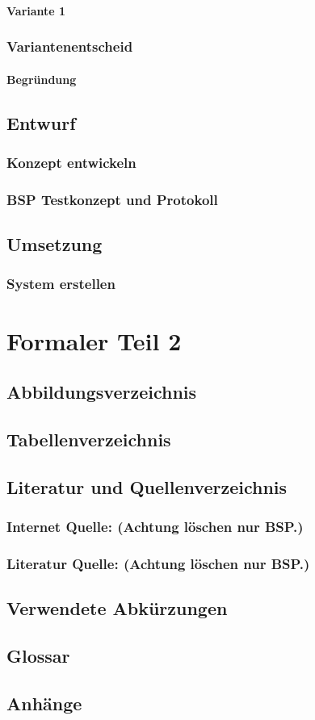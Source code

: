 \documentclass{report}
\begin{document}
\subsection{Variante 1}
\section{Variantenentscheid}
\subsection{Begründung}

\chapter{Entwurf}
\section{Konzept entwickeln}
\section{BSP Testkonzept und Protokoll}

\chapter{Umsetzung}
\section{System erstellen}

\part{Formaler Teil 2}
\chapter{Abbildungsverzeichnis}

\chapter{Tabellenverzeichnis}

\chapter{Literatur und Quellenverzeichnis}
\section{Internet Quelle: (Achtung löschen nur BSP.)}
\section{Literatur Quelle: (Achtung löschen nur BSP.)}

\chapter{Verwendete Abkürzungen}

\chapter{Glossar}

\chapter{Anhänge}
\end{document}
